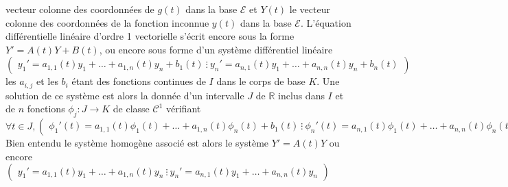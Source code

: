 vecteur colonne des coordonnées de $g(t)$ dans la base $\mathcal{E}$ et $Y(t)$ le
vecteur colonne des coordonnées de la fonction inconnue $y(t)$ dans la
base $\mathcal{E}$. L'équation différentielle linéaire d'ordre 1 vectorielle s'écrit
encore sous la forme $Y' = A(t)Y + B(t)$, ou encore sous forme d'un
système différentiel linéaire
$\begin{pmatrix}
y_1' = a_{1,1}(t)y_1 + \ldots + a_{1,n}(t)y_n + b_1(t) \
\vdots \
y_n' = a_{n,1}(t)y_1 + \ldots + a_{n,n}(t)y_n + b_n(t)
\end{pmatrix}$
les $a_{i,j}$ et les $b_i$ étant des fonctions continues de
$I$ dans le corps de base $K$. Une solution de ce système est alors la
donnée d'un intervalle $J$ de $\mathbb{R}$ inclus dans $I$ et de $n$ fonctions
$\phi_j : J \rightarrow K$ de classe $\mathcal{C}^1$ vérifiant
$\forall t \in J,
\begin{pmatrix}
\phi_1'(t) = a_{1,1}(t)\phi_1(t) + \ldots + a_{1,n}(t)\phi_n(t) + b_1(t) \
\vdots \
\phi_n'(t) = a_{n,1}(t)\phi_1(t) + \ldots + a_{n,n}(t)\phi_n(t) + b_n(t)
\end{pmatrix}$
Bien entendu le système homogène associé est alors le système $Y' = A(t)Y$ ou encore
$\begin{pmatrix}
y_1' = a_{1,1}(t)y_1 + \ldots + a_{1,n}(t)y_n \
\vdots \
y_n' = a_{n,1}(t)y_1 + \ldots + a_{n,n}(t)y_n
\end{pmatrix}$
